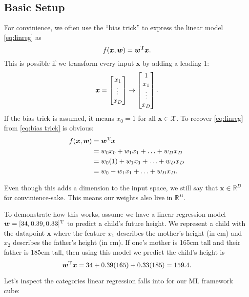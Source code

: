 \subsection{Basic Setup}

For convinience, we often use the ``bias trick'' to express the linear model \autoref{eq:linreg} as
\begin{equation}
    \label{eq:bias trick}
    f(\bm x, \bm w) = \bm w^{\mathrm T} \bm x.
\end{equation}
This is possible if we transform every input $\bm x$ by adding a leading 1: $$\bm x = \begin{bmatrix}x_1\\\vdots\\x_D\end{bmatrix} \to \begin{bmatrix}1\\x_1\\\vdots\\x_D\end{bmatrix}.$$ If the bias trick is assumed, it means $x_0 = 1$ for all $\bm x \in \mathcal X$. To recover \autoref{eq:linreg} from \autoref{eq:bias trick} is obvious:
\begin{align*}
    f(\bm x, \bm w) &= \bm w^{\mathrm T} \bm x \\
    &= w_0 x_0 + w_1 x_1 + \ldots + w_D x_D \\
    &= w_0 (1) + w_1 x_1 + \ldots + w_D x_D \\
    &= w_0 + w_1 x_1 + \ldots + w_D x_D.
\end{align*}

\begin{warning}
    Even though this adds a dimension to the input space, we still say that $\bm x \in \mathbb R^D$ for convinience-sake. This means our weights also live in $\mathbb R^D$. 
\end{warning}

To demonstrate how this works, assume we have a linear regression model $\bm w = [34, 0.39, 0.33]^{\mathrm T}$ to predict a child's future height. We represent a child with the datapoint $\bm x$ where the feature $x_1$ describes the mother's height (in cm) and $x_2$ describes the father's height (in cm). If one's mother is 165cm tall and their father is 185cm tall, then using this model we predict the child's height is $$\bm w^{\mathrm T} \bm x = 34 + 0.39(165) + 0.33(185) = 159.4.$$

Let's inspect the categories linear regression falls into for our ML framework cube:

